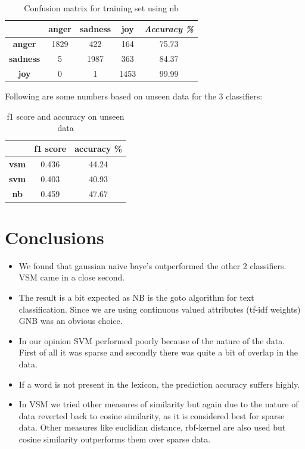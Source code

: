 \begin{table}[ht!]
  \centering
  \label{tab-confusion-nb}
  \begin{tabular}{c|c|c|c|c}
  & \textbf{anger} & \textbf{sadness} & \textbf{joy} & \emph{Accuracy \%}\\
  \hline
  \textbf{anger} & 1829 & 422 & 164 & 75.73 \\
  \textbf{sadness} & 5 & 1987 & 363 & 84.37 \\
  \textbf{joy} & 0 & 1 & 1453 & 99.99 \\
  \end{tabular}
  \caption{Confusion matrix for training set using nb}
\end{table}
\newpage
Following are some numbers based on unseen data for the 3 classifiers:

\begin{table}[ht!]
  \centering
  \label{tab-f1score}
  \begin{tabular}{c|c|c}
  & \textbf{f1 score} & \textbf{accuracy \%} \\
  \hline
  \textbf{vsm} & 0.436 & 44.24 \\
  \textbf{svm} & 0.403 & 40.93 \\
  \textbf{nb} & 0.459 & 47.67 \\
  \end{tabular}
  \caption{f1 score and accuracy on unseen data}
\end{table}

\section{Conclusions}
\label{sec-conclusion}
\begin{itemize}
\item We found that gaussian naive baye's outperformed the other 2 classifiers. VSM came in a close second.
\item The result is a bit expected as NB is the goto algorithm for text classification. Since we are using continuous valued attributes (tf-idf weights) GNB was an obvious choice.
\item In our opinion SVM performed poorly because of the nature of the data. First of all it was sparse and secondly there was quite a bit of overlap in the data.
\item If a word is not present in the lexicon, the prediction accuracy suffers highly.
\item In VSM we tried other measures of similarity but again due to the nature of data reverted back to cosine similarity, as it is considered best for sparse data. Other measures like euclidian distance, rbf-kernel are also used but cosine similarity outperforms them over sparse data.
\end{itemize}


